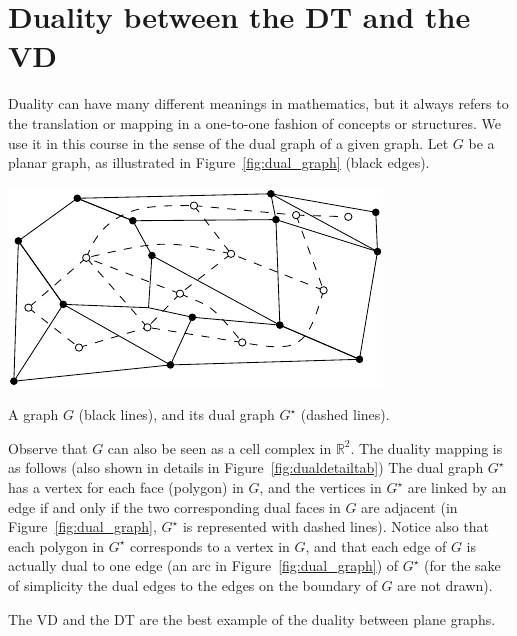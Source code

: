 %
\section[Duality DT/VD]{Duality between the DT and the VD}%
\label{sec:duality}

Duality can have many different meanings in mathematics, but it always refers to the translation or mapping in a one-to-one fashion of concepts or structures. 
We use it in this course in the sense of the dual graph of a given graph. 
Let $G$ be a planar graph, as illustrated in Figure~\ref{fig:dual_graph} (black edges).
\begin{marginfigure}
  \includegraphics[width=\textwidth]{figs/dual_graph}
  \caption{A graph $G$ (black lines), and its dual graph $G^\star$ (dashed lines).}%
\label{fig:dual_graph}
\end{marginfigure}
Observe that $G$ can also be seen as a cell complex in $\mathbb{R}^{2}$. 
The duality mapping is as follows (also shown in details in Figure~\ref{fig:dualdetailtab})
The dual graph $G^{\star}$ has a vertex for each face (polygon) in $G$, and the vertices in $G^{\star}$ are linked by an edge if and only if the two corresponding dual faces in $G$ are adjacent (in Figure~\ref{fig:dual_graph}, $G^{\star}$ is represented with dashed lines). 
Notice also that each polygon in $G^{\star}$ corresponds to a vertex in $G$, and that each edge of $G$ is actually dual to one edge (an arc in Figure~\ref{fig:dual_graph}) of $G^{\star}$ (for the sake of simplicity the dual edges to the edges on the boundary of $G$ are not drawn).

The VD and the DT are the best example of the duality between plane graphs.

